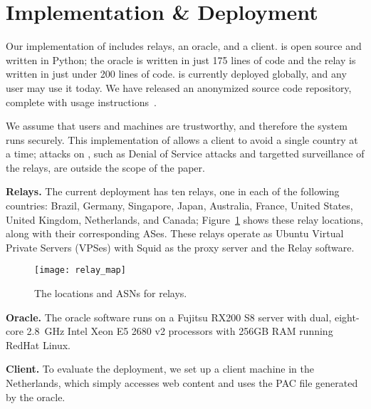\section{Implementation \& Deployment}

Our implementation of \system{} includes relays, an oracle, and 
a client. \system{} is open source and written in Python; the oracle is written in just 
175 lines of code and the relay is written in just under 200 lines of code.  \system{} is currently deployed globally, and
any user may use it today.  We have released an anonymized source code repository,
complete with usage instructions~\cite{ran_system}.

We assume that users and machines are trustworthy, and therefore the system runs 
securely.  This implementation of \system{} allows a client to avoid a single country 
at a time; attacks on \system{}, such as Denial of Service attacks and targetted 
surveillance of the relays, are outside the scope of the paper.

{\bf Relays.}  The current deployment has ten relays, one in each
of the following
countries: Brazil,  Germany, Singapore, Japan, Australia, France, United
States, United Kingdom, Netherlands, and Canada; Figure~\ref{fig:relay_locations}
shows these relay locations, along with their corresponding ASes. These relays operate
as Ubuntu Virtual Private Servers (VPSes) with Squid as the proxy
server and the \system{} Relay software.

\begin{figure}[t!]
\centering
\texttt{[image: relay\_map]}
\caption{The locations and ASNs for \system{} relays.}
\label{fig:relay_locations}
\end{figure}

{\bf Oracle.}  The oracle software runs on a Fujitsu RX200 S8 server with dual, 
eight-core 2.8~GHz Intel Xeon E5 2680 v2 processors with 256GB RAM running 
RedHat Linux. 

{\bf Client.} To evaluate the \system{} deployment, we set up a client 
machine in the Netherlands, which simply accesses web content and uses the PAC 
file generated by the oracle. 


